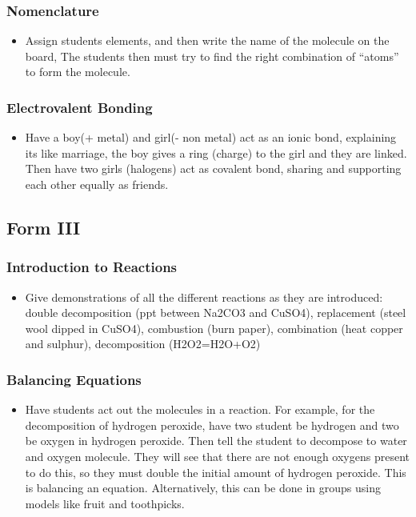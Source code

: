 \subsubsection{Nomenclature}
\begin{itemize}
\item	Assign students elements, and then write the name of the molecule on the board, The students then must try to find the right combination of ``atoms'' to form the molecule. 
\end{itemize}

\subsubsection{Electrovalent Bonding}
\begin{itemize}
\item	Have a boy(+ metal) and girl(- non metal) act as an ionic bond, explaining its like marriage, the boy gives a ring (charge) to the girl and they are linked.  Then have two girls (halogens) act as covalent bond, sharing and supporting each other equally as friends.
\end{itemize}

\subsection{Form III}
\subsubsection{Introduction to Reactions}
\begin{itemize}
\item	Give demonstrations of all the different reactions as they are introduced: double decomposition (ppt between  Na2CO3 and CuSO4), replacement (steel wool dipped in CuSO4), combustion (burn paper), combination (heat copper and sulphur), decomposition (H2O2=H2O+O2) 
\end{itemize}

\subsubsection{Balancing Equations}
\begin{itemize}
\item Have students act out the molecules in a reaction. For example, for the decomposition of hydrogen peroxide, have two student be hydrogen and two be oxygen in hydrogen peroxide. Then tell the student to decompose to water and oxygen molecule. They will see that there are not enough oxygens present to do this, so they must double the initial amount of hydrogen peroxide. This is balancing an equation. Alternatively, this can be done in groups using models like fruit and toothpicks.
\end{itemize}

